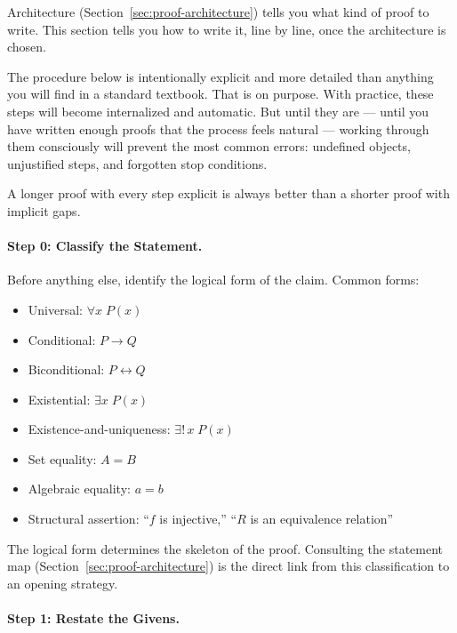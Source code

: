 
\begin{remark}
Architecture (Section~\ref{sec:proof-architecture}) tells you what kind
of proof to write. This section tells you how to write it, line by line,
once the architecture is chosen.

The procedure below is intentionally explicit and more detailed than
anything you will find in a standard textbook. That is on purpose.
With practice, these steps will become internalized and automatic.
But until they are --- until you have written enough proofs that the
process feels natural --- working through them consciously will prevent
the most common errors: undefined objects, unjustified steps, and
forgotten stop conditions.

A longer proof with every step explicit is always better than a shorter
proof with implicit gaps.
\end{remark}

\paragraph{Step 0: Classify the Statement.}

Before anything else, identify the logical form of the claim. Common
forms:
\begin{itemize}[itemsep=2pt]
  \item Universal: $\forall x\; P(x)$
  \item Conditional: $P \rightarrow Q$
  \item Biconditional: $P \leftrightarrow Q$
  \item Existential: $\exists x\; P(x)$
  \item Existence-and-uniqueness: $\exists!\, x\; P(x)$
  \item Set equality: $A = B$
  \item Algebraic equality: $a = b$
  \item Structural assertion: ``$f$ is injective,'' ``$R$ is an equivalence relation''
\end{itemize}

The logical form determines the skeleton of the proof. Consulting the
statement map (Section~\ref{sec:proof-architecture}) is the direct link
from this classification to an opening strategy.

\paragraph{Step 1: Restate the Givens.}

